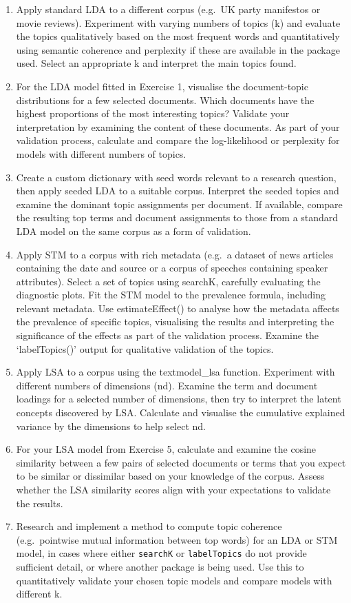 \documentclass[
]{book}
\begin{document}
\begin{enumerate}
\def\labelenumi{\arabic{enumi}.}
\item
  Apply standard LDA to a different corpus (e.g.~UK party manifestos or movie reviews). Experiment with varying numbers of topics (k) and evaluate the topics qualitatively based on the most frequent words and quantitatively using semantic coherence and perplexity if these are available in the package used. Select an appropriate k and interpret the main topics found.
\item
  For the LDA model fitted in Exercise 1, visualise the document-topic distributions for a few selected documents. Which documents have the highest proportions of the most interesting topics? Validate your interpretation by examining the content of these documents. As part of your validation process, calculate and compare the log-likelihood or perplexity for models with different numbers of topics.
\item
  Create a custom dictionary with seed words relevant to a research question, then apply seeded LDA to a suitable corpus. Interpret the seeded topics and examine the dominant topic assignments per document. If available, compare the resulting top terms and document assignments to those from a standard LDA model on the same corpus as a form of validation.
\item
  Apply STM to a corpus with rich metadata (e.g.~a dataset of news articles containing the date and source or a corpus of speeches containing speaker attributes). Select a set of topics using searchK, carefully evaluating the diagnostic plots. Fit the STM model to the prevalence formula, including relevant metadata. Use estimateEffect() to analyse how the metadata affects the prevalence of specific topics, visualising the results and interpreting the significance of the effects as part of the validation process. Examine the `labelTopics()' output for qualitative validation of the topics.
\item
  Apply LSA to a corpus using the textmodel\_lsa function. Experiment with different numbers of dimensions (nd). Examine the term and document loadings for a selected number of dimensions, then try to interpret the latent concepts discovered by LSA. Calculate and visualise the cumulative explained variance by the dimensions to help select nd.
\item
  For your LSA model from Exercise 5, calculate and examine the cosine similarity between a few pairs of selected documents or terms that you expect to be similar or dissimilar based on your knowledge of the corpus. Assess whether the LSA similarity scores align with your expectations to validate the results.
\item
  Research and implement a method to compute topic coherence (e.g.~pointwise mutual information between top words) for an LDA or STM model, in cases where either \texttt{searchK} or \texttt{labelTopics} do not provide sufficient detail, or where another package is being used. Use this to quantitatively validate your chosen topic models and compare models with different k.
\end{enumerate}
\end{document}
